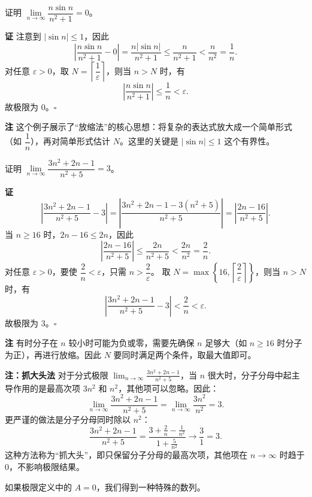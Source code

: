 \documentclass[fontset=fandol]{ctexart}
\newenvironment{custom}[1]{\par\noindent\textbf{#1}\quad}{\par\vspace{0.8em}}
\newenvironment{remark}{\par\noindent\textbf{注}\quad}{\par\vspace{0.8em}}
\begin{document}
\begin{example}
证明 \(\lim\limits_{n\to\infty} \dfrac{n \sin n}{n^2 + 1} = 0\)。
\end{example}
\begin{custom}{证}
注意到 \(|\sin n| \leq 1\)，因此
\[
\left|\dfrac{n \sin n}{n^2 + 1} - 0\right| = \dfrac{n |\sin n|}{n^2 + 1} \leq \dfrac{n}{n^2 + 1} < \dfrac{n}{n^2} = \dfrac{1}{n}.
\]
对任意 \(\varepsilon > 0\)，取 \(N = \left\lceil \dfrac{1}{\varepsilon} \right\rceil\)，则当 \(n > N\) 时，有
\[
\left|\dfrac{n \sin n}{n^2 + 1}\right| \leq \dfrac{1}{n} < \varepsilon.
\]
故极限为 0。\(\square\)
\end{custom}

\begin{remark}
这个例子展示了“放缩法”的核心思想：将复杂的表达式放大成一个简单形式（如 \(\dfrac{1}{n}\)），再对简单形式估计 \(N\)。这里的关键是 \(|\sin n| \leq 1\) 这个有界性。
\end{remark}

\begin{example}证明 \(\lim\limits_{n\to\infty} \dfrac{3n^2 + 2n - 1}{n^2 + 5} = 3\)。
\end{example}
\begin{custom}{证}
\[
\left|\dfrac{3n^2 + 2n - 1}{n^2 + 5} - 3\right| = \left|\dfrac{3n^2 + 2n - 1 - 3(n^2 + 5)}{n^2 + 5}\right| = \left|\dfrac{2n - 16}{n^2 + 5}\right|.
\]
当 \(n \geq 16\) 时，\(2n - 16 \leq 2n\)，因此
\[
\left|\dfrac{2n - 16}{n^2 + 5}\right| \leq \dfrac{2n}{n^2 + 5} < \dfrac{2n}{n^2} = \dfrac{2}{n}.
\]
对任意 \(\varepsilon > 0\)，要使 \(\dfrac{2}{n} < \varepsilon\)，只需 \(n > \dfrac{2}{\varepsilon}\)。
取 \(N = \max\left\{16, \left\lceil \dfrac{2}{\varepsilon} \right\rceil\right\}\)，则当 \(n > N\) 时，有
\[
\left|\dfrac{3n^2 + 2n - 1}{n^2 + 5} - 3\right| < \dfrac{2}{n} < \varepsilon.
\]
故极限为 3。\(\square\)
\end{custom}

\begin{remark}
有时分子在 \(n\) 较小时可能为负或零，需要先确保 \(n\) 足够大（如 \(n \geq 16\) 时分子为正），再进行放缩。因此 \(N\) 要同时满足两个条件，取最大值即可。
\end{remark}

\begin{custom}{注：抓大头法}
对于分式极限 \(\lim_{n\to\infty} \frac{3n^2 + 2n - 1}{n^2 + 5}\)，当 \(n\) 很大时，分子分母中起主导作用的是最高次项 \(3n^2\) 和 \(n^2\)，其他项可以忽略。因此：
\[
\lim\limits_{n \to \infty} \frac{3n^2 + 2n - 1}{n^2 + 5} = \lim\limits_{n \to \infty} \frac{3n^2}{n^2} = 3.
\]
更严谨的做法是分子分母同时除以 \(n^2\)：
\[
\frac{3n^2 + 2n - 1}{n^2 + 5} = \frac{3 + \frac{2}{n} - \frac{1}{n^2}}{1 + \frac{5}{n^2}} \to \frac{3}{1} = 3.
\]
这种方法称为“抓大头”，即只保留分子分母的最高次项，其他项在 \(n\to\infty\) 时趋于 0，不影响极限结果。
\end{custom}
如果极限定义中的 \(A = 0\)，我们得到一种特殊的数列。
\end{document}
